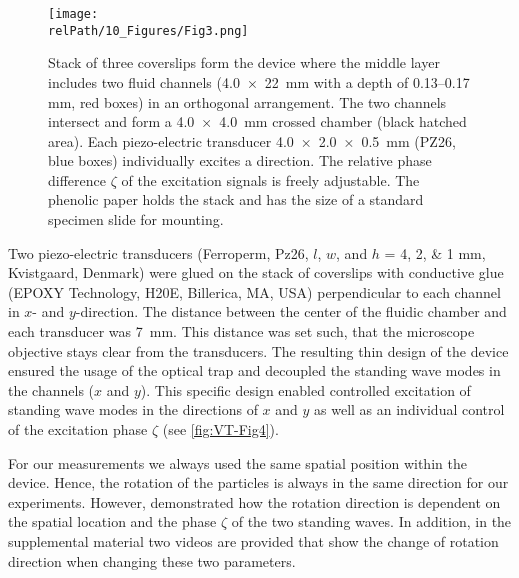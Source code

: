 \begin{figure}
    \centering
    \texttt{[image: \\relPath/10\_Figures/Fig3.png]}
    \caption{Stack of three coverslips form the device where the middle layer 
    includes two fluid channels (\SI{4.0x22}{\mm} with a depth of 
    \numrange{0.13}{0.17} \si{\milli\meter}, red boxes) in an orthogonal 
    arrangement. The two channels intersect and form a \SI{4.0x4.0}{\mm} crossed 
    chamber (black hatched area). Each piezo-electric transducer 
    \SI{4.0x2.0x0.5}{\mm} (PZ26, blue boxes) individually excites a direction.  
    The relative phase difference $\zeta$ of the excitation signals is freely 
    adjustable. The phenolic paper holds the stack and has the size of a 
    standard specimen slide for mounting.\label{fig:VT-Fig3}}
\end{figure}

Two piezo-electric transducers (Ferroperm, Pz26, $l$, $w$, and $h$ = \numlist{4; 
2; 1} \si{\mm}, Kvistgaard, Denmark) were glued on the stack of coverslips with 
conductive glue (EPOXY Technology, H20E, Billerica, MA, USA) perpendicular to 
each channel in $x$- and $y$-direction. The distance between the center of the 
fluidic chamber and each transducer was \SI{7}{\mm}. This distance was set such, 
that the microscope objective stays clear from the transducers. The resulting 
thin design of the device ensured the usage of the optical trap and decoupled 
the standing wave modes in the channels ($x$ and $y$). This specific design 
enabled controlled excitation of standing wave modes in the directions of $x$ 
and $y$ as well as an individual control of the excitation phase $\zeta$ (see 
\cref{fig:VT-Fig4}).

For our measurements we always used the same spatial position within the device.  
Hence, the rotation of the particles is always in the same direction for our 
experiments. However, \citeauthor{Lamprecht2015} \cite{Lamprecht2015} 
demonstrated how the rotation direction is dependent on the spatial location and 
the phase $\zeta$ of the two standing waves. In addition, in the supplemental 
material two videos are provided that show the change of rotation direction when 
changing these two parameters.

